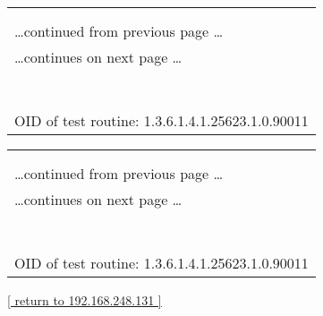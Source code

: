 \documentclass{article}
\begin{document}
\begin{longtable}{|p{}|}
\hline
\rowcolor{openvas_note}{\color{white}{Low (CVSS: 0.0) }}\\
\rowcolor{openvas_note}{\color{white}{NVT: SMB Test}}\\
\hline
\endfirsthead
\hfill\ldots continued from previous page \ldots \\
\hline
\endhead
\hline
\ldots continues on next page \ldots \\
\endfoot
\hline
\endlastfoot
\\
\rowcolor{white}{\verb=OS Version =\verb-=-\verb= Windows Vista (TM) Business 6000=}\\
\rowcolor{white}{\verb=Domain =\verb-=-\verb= WORKGROUP=}\\
\rowcolor{white}{\verb=SMB Serverversion =\verb-=-\verb= WINDOWS VISTA (TM) BUSINESS 6.0=}\\
\rowcolor{white}{\verb==}\\
\rowcolor{white}{\verb==}\\
\\
OID of test routine: 1.3.6.1.4.1.25623.1.0.90011\\
\end{longtable}

\begin{longtable}{|p{}|}
\hline
\rowcolor{openvas_note}{\color{white}{Low (CVSS: 0.0) }}\\
\rowcolor{openvas_note}{\color{white}{NVT: SMB Test}}\\
\hline
\endfirsthead
\hfill\ldots continued from previous page \ldots \\
\hline
\endhead
\hline
\ldots continues on next page \ldots \\
\endfoot
\hline
\endlastfoot
\\
\rowcolor{white}{\verb=OS Version =\verb-=-\verb= Windows Vista (TM) Business 6000=}\\
\rowcolor{white}{\verb=Domain =\verb-=-\verb= WORKGROUP=}\\
\rowcolor{white}{\verb=SMB Serverversion =\verb-=-\verb= Windows Vista (TM) Business 6.0=}\\
\rowcolor{white}{\verb==}\\
\rowcolor{white}{\verb==}\\
\\
OID of test routine: 1.3.6.1.4.1.25623.1.0.90011\\
\end{longtable}

\begin{footnotesize}\hyperref[host:192.168.248.131]{[ return to 192.168.248.131 ]}\end{footnotesize}
\end{document}
